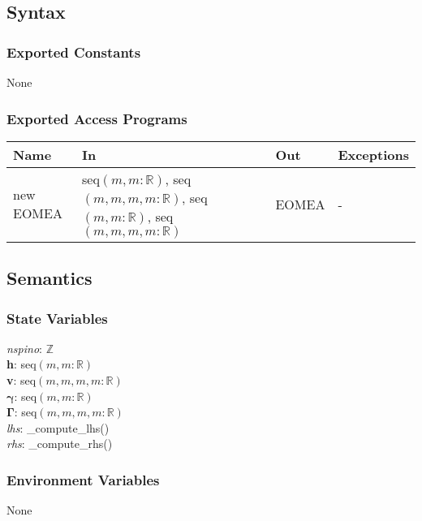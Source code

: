 \documentclass[12pt, titlepage]{article}
\begin{document}
\subsection{Syntax}

\subsubsection{Exported Constants}
None

\subsubsection{Exported Access Programs}

\begin{center}
	\begin{tabular}{p{2.3cm} p{4cm} p{4cm} p{2cm}}
		\hline
		\textbf{Name} & \textbf{In} & \textbf{Out} & \textbf{Exceptions} \\
		\hline
		new EOMEA & seq$(m,m:\mathbb{R})$, seq$(m,m,m,m:\mathbb{R})$, 
		seq$(m,m:\mathbb{R})$, seq$(m,m,m,m:\mathbb{R})$& EOMEA & - \\
		\hline
	\end{tabular}
\end{center}

\subsection{Semantics}

\subsubsection{State Variables}
\textit{nspino}: $\mathbb{Z}$\\
\textbf{h}: seq$(m,m:\mathbb{R})$\\
\textbf{v}: seq$(m,m,m,m:\mathbb{R})$\\
$\boldsymbol{\gamma}$: seq$(m,m:\mathbb{R})$\\
$\boldsymbol{\Gamma}$: seq$(m,m,m,m:\mathbb{R})$\\
\textit{lhs}: \_compute\_lhs()\\
\textit{rhs}: \_compute\_rhs()

\subsubsection{Environment Variables}

None
\end{document}
